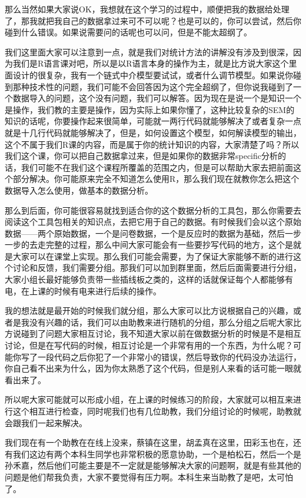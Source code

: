 \documentclass[
  oneside]{book}
\begin{document}
那么当然如果大家说OK，我想就在这个学习的过程中，顺便把我的数据给处理了，那我就把我自己的数据拿过来可不可以呢？也是可以的，你可以尝试，然后你碰到什么错误。如果说需要问的话呢也可以问，但是不能太超纲了。

我们这里面大家可以注意到一点，就是我们对统计方法的讲解没有涉及到很深，因为我们是R语言课对吧，所以是以R语言本身的操作为主，就是比方说大家这个里面设计的很复杂，我有一个链式中介模型要试试，或者什么调节模型。如果说你碰到那种技术性的问题，我们可能不会回答因为这个完全超纲了，但你说我碰到了一个数据导入的问题，这个没有问题，我们可以解答。因为现在是说一个是知识一个是操作，我们教的主要是操作，因为实际上如果你懂了，这种比较复杂的SEM的知识的话呢，你要操作起来很简单，可能就一两行代码就能够解决了或者复杂一点就是十几行代码就能够解决了，但是，如何设置这个模型，如何解读模型的输出，这个不属于我们R课的内容，而是属于你的统计知识的内容，大家清楚了吗？所以我们这个课，你可以把自己数据拿过来，但是如果你的数据非常specific分析的话，我们可能不在我们这个课程所覆盖的范围之内，但是可以帮助大家去把前面这个部分解决。你可能原来完全不知道怎么使用R，那么我们现在就教你怎么把这个数据导入怎么使用，做基本的数据分析。

那么到后面，你可能很容易就找到适合你的这个数据分析的工具包，那么你需要去阅读这个工具包相关的知识点，去把它用于自己的数据。有时候我们会以这个原始数据------两个原始数据，一个是问卷数据，一个是反应时的数据为基础，然后一步一步的去走完整的过程，那么中间大家可能会有一些要抄写代码的地方，这个是就是大家可以在课堂上实现。那么我们可能会需要，为了保证大家能够不断的进行这个讨论和反馈，我们需要分组。那我们可以加到群里面，然后后面需要进行分组，大家小组长最好能够负责带一些插线板之类的，这样的话就保证每个人都能够有电，在上课的时候有电来进行后续的操作。

我的想法就是最开始的时候我们就分组，那么大家可以比方说根据自己的兴趣，或者是我没有兴趣的话，我们可以由助教来进行随机的分组，那么分组之后呢大家比方说碰到了问题大家相互讨论，我不知道大家以前在做数据分析的时候是不是相互讨论，但是在写代码的时候，相互讨论是一个非常有用的一个东西，为什么呢？可能你写了一段代码之后你犯了一个非常小的错误，然后导致你的代码没办法运行，你自己看不出来为什么，因为你太熟悉了这个代码，但是别人来看的话可能一眼就看出来了。

所以呢大家可能就可以形成小组，在上课的时候练习的阶段，大家就可以相互来进行这个相互进行检查，同时呢我们也有几位助教，我们分组讨论的时候呢，助教就会跟我们一起来解决。

我们现在有一个助教在在线上没来，蔡镇在这里，胡孟真在这里，田彩玉也在，还有我们这边有两个本科生同学也非常积极的愿意协助，一个是柏松石，然后一个是孙禾嘉，然后他们可能主要是不一定就是能够解决大家的问题啊，就是有些其他的问题是他们帮我负责，大家不要觉得有压力啊。本科生来当助教了是吧，太可怕了。
\end{document}

